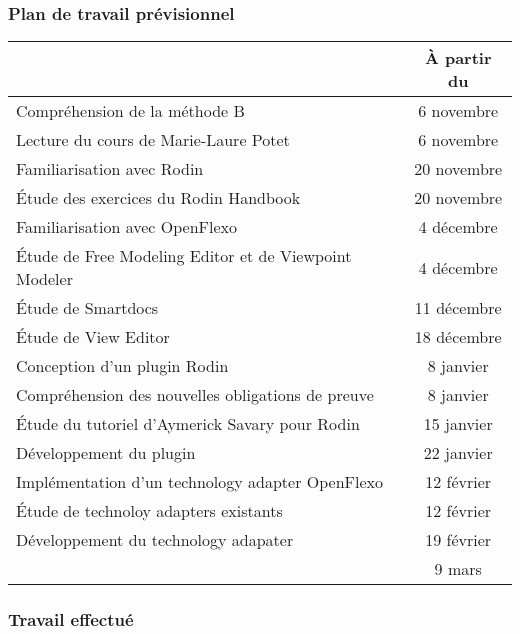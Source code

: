 \documentclass[aspectratio=169]{beamer}
\begin{document}
\begin{frame}
    \frametitle{Plan de travail prévisionnel}

    \footnotesize

    \begin{table}
    \centering
    \begin{tabular}{| l c |}
        \hline
        \rowcolor{Header}\multicolumn{1}{|c}{Tâche} & À partir du \\ \hline \hline

        \rowcolor{Task}Compréhension de la méthode B & 6 novembre \\
        \rowcolor{Subtask}\qquad Lecture du cours de Marie-Laure Potet & 6 novembre \\ \hline

        \rowcolor{Task}Familiarisation avec Rodin & 20 novembre \\
        \rowcolor{Subtask}\qquad Étude des exercices du Rodin Handbook & 20 novembre \\ \hline

        \rowcolor{Task}Familiarisation avec OpenFlexo & 4 décembre \\
        \rowcolor{Subtask}\qquad Étude de Free Modeling Editor et de Viewpoint Modeler & 4 décembre \\
        \rowcolor{Subtask}\qquad Étude de Smartdocs & 11 décembre \\
        \rowcolor{Subtask}\qquad Étude de View Editor & 18 décembre \\ \hline

        \rowcolor{Task}Conception d'un plugin Rodin & 8 janvier \\
        \rowcolor{Subtask}\qquad Compréhension des nouvelles obligations de preuve & 8 janvier \\
        \rowcolor{Subtask}\qquad Étude du tutoriel d'Aymerick Savary pour Rodin & 15 janvier \\
        \rowcolor{Subtask}\qquad Développement du plugin & 22 janvier \\ \hline

        \rowcolor{Task}Implémentation d'un technology adapter OpenFlexo & 12 février \\
        \rowcolor{Subtask}\qquad Étude de technoloy adapters existants & 12 février \\
        \rowcolor{Subtask}\qquad Développement du technology adapater & 19 février \\ \hline \hline

        \rowcolor{Task}\multicolumn{1}{|c}{Fin} & 9 mars \\ \hline

    \end{tabular}
    \end{table}
\end{frame}

\begin{frame}
    \frametitle{Travail effectué}
\end{frame}
\end{document}
